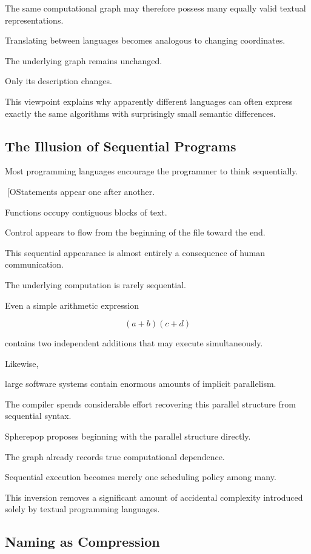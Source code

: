 \documentclass[12pt,oneside]{article}
\begin{document}
The same computational graph may therefore possess many equally valid textual representations.

Translating between languages becomes analogous to changing coordinates.

The underlying graph remains unchanged.

Only its description changes.

This viewpoint explains why apparently different languages can often express exactly the same algorithms with surprisingly small semantic differences.

\subsection{The Illusion of Sequential Programs}

Most programming languages encourage the programmer to think sequentially.

[OStatements appear one after another.

Functions occupy contiguous blocks of text.

Control appears to flow from the beginning of the file toward the end.

This sequential appearance is almost entirely a consequence of human communication.

The underlying computation is rarely sequential.

Even a simple arithmetic expression

\[
(a+b)(c+d)
\]

contains two independent additions that may execute simultaneously.

Likewise,

large software systems contain enormous amounts of implicit parallelism.

The compiler spends considerable effort recovering this parallel structure from sequential syntax.

Spherepop proposes beginning with the parallel structure directly.

The graph already records true computational dependence.

Sequential execution becomes merely one scheduling policy among many.

This inversion removes a significant amount of accidental complexity introduced solely by textual programming languages.

\subsection{Naming as Compression}
\end{document}
